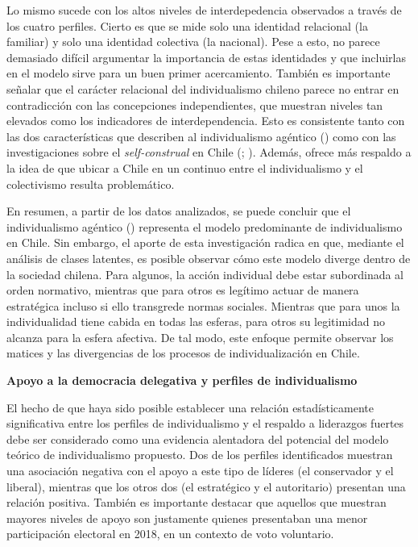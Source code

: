 \documentclass[
  letterpaper,
  DIV=11,
  numbers=noendperiod]{scrartcl}
\begin{document}
Lo mismo sucede con los altos niveles de interdepedencia observados a
través de los cuatro perfiles. Cierto es que se mide solo una identidad
relacional (la familiar) y solo una identidad colectiva (la nacional).
Pese a esto, no parece demasiado difícil argumentar la importancia de
estas identidades y que incluirlas en el modelo sirve para un buen
primer acercamiento. También es importante señalar que el carácter
relacional del individualismo chileno parece no entrar en contradicción
con las concepciones independientes, que muestran niveles tan elevados
como los indicadores de interdependencia. Esto es consistente tanto con
las dos características que describen al individualismo agéntico
() como con las
investigaciones sobre el \emph{self-construal} en Chile
(;
). Además, ofrece
más respaldo a la idea de que ubicar a Chile en un continuo entre el
individualismo y el colectivismo resulta problemático.

En resumen, a partir de los datos analizados, se puede concluir que el
individualismo agéntico () representa el modelo predominante de individualismo en Chile.
Sin embargo, el aporte de esta investigación radica en que, mediante el
análisis de clases latentes, es posible observar cómo este modelo
diverge dentro de la sociedad chilena. Para algunos, la acción
individual debe estar subordinada al orden normativo, mientras que para
otros es legítimo actuar de manera estratégica incluso si ello
transgrede normas sociales. Mientras que para unos la individualidad
tiene cabida en todas las esferas, para otros su legitimidad no alcanza
para la esfera afectiva. De tal modo, este enfoque permite observar los
matices y las divergencias de los procesos de individualización en
Chile.

\textbf{Apoyo a la democracia delegativa y perfiles de individualismo}

El hecho de que haya sido posible establecer una relación
estadísticamente significativa entre los perfiles de individualismo y el
respaldo a liderazgos fuertes debe ser considerado como una evidencia
alentadora del potencial del modelo teórico de individualismo propuesto.
Dos de los perfiles identificados muestran una asociación negativa con
el apoyo a este tipo de líderes (el conservador y el liberal), mientras
que los otros dos (el estratégico y el autoritario) presentan una
relación positiva. También es importante destacar que aquellos que
muestran mayores niveles de apoyo son justamente quienes presentaban una
menor participación electoral en 2018, en un contexto de voto
voluntario.
\end{document}
